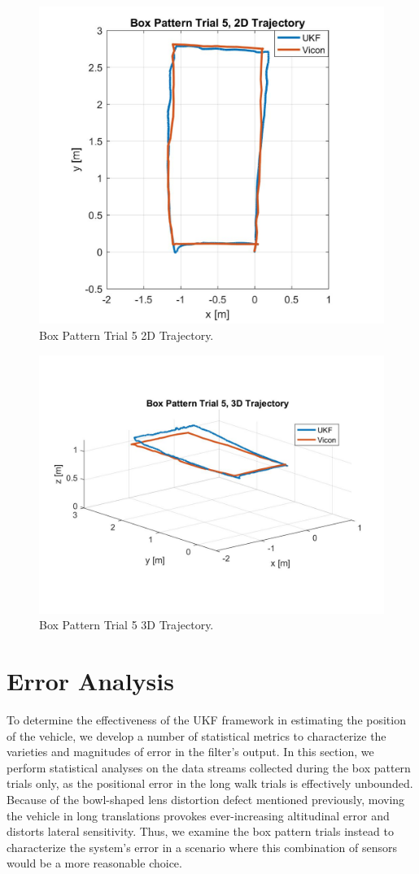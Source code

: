 \begin{figure}[p]
  \centering
    \includegraphics[height=0.6\textwidth]{box5_2d}
  \caption[Box Pattern Trial 5 2D Trajectory]{Box Pattern Trial 5 2D Trajectory.}
  \label{fig:box5_2d}
\end{figure}
\begin{figure}[p]
  \centering
    \includegraphics[height=0.7\textwidth]{box5_3d}
  \caption[Box Pattern Trial 5 3D Trajectory]{Box Pattern Trial 5 3D Trajectory.}
  \label{fig:box5_3d}
\end{figure}
\clearpage

\section{Error Analysis}

To determine the effectiveness of the UKF framework in estimating the position of the vehicle, we develop a number of statistical metrics to characterize the varieties and magnitudes of error in the filter's output. In this section, we perform statistical analyses on the data streams collected during the box pattern trials only, as the positional error in the long walk trials is effectively unbounded. Because of the bowl-shaped lens distortion defect mentioned previously, moving the vehicle in long translations provokes ever-increasing altitudinal error and distorts lateral sensitivity. Thus, we examine the box pattern trials instead to characterize the system's error in a scenario where this combination of sensors would be a more reasonable choice.

